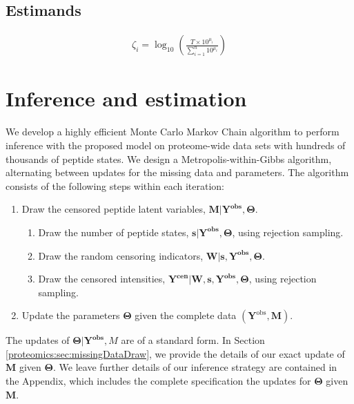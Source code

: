 
\subsection{Estimands}

\begin{eqnarray}
\zeta_i = \log_{10} \left( \frac{T \times 10^{\mu_i}}{ \sum_{i=1}^{n} 10^{\mu_i}} \right) \label{proteomics:eq:abs_abund_estimand} 
\end{eqnarray}




\section{Inference and estimation}
\label{proteomics:sec:estimation}

We develop a highly efficient Monte Carlo Markov Chain algorithm to perform inference with the proposed model on proteome-wide data sets with hundreds of thousands of peptide states.
We design a Metropolis-within-Gibbs algorithm, alternating between updates for the missing data and parameters.
The algorithm consists of the following steps within each iteration:
%
\begin{enumerate}
\item Draw the censored peptide latent variables, $\mathbf{M}\vert\mathbf{Y^{obs}}, \bm \Theta$.

\begin{enumerate}
\item Draw the number of peptide states, $\bm s \vert \mathbf{Y^{obs}}, \bm \Theta$, using rejection sampling.
\item Draw the random censoring indicators, $\bm{W} \vert \bm s,  \mathbf{Y^{obs}}, \bm \Theta$.
\item Draw the censored intensities, $\mathbf{Y^{cen}} \vert \bm{W},\bm{s}, \bm{Y^{obs}}, \bm{\Theta}$, using rejection sampling.
\end{enumerate}
\item Update the parameters $\bm \Theta$ given the complete data $(\bm Y^\mathrm{obs}, \bm M)$.
\end{enumerate}
%
The updates of $\bm{\Theta} | \bm{Y^{obs}}, M$ are of a standard form.
In Section \ref{proteomics:sec:missingDataDraw}, we provide the details of our exact update of $\bm M$ given $\bm \Theta$.
We leave further details of our inference strategy are contained in the Appendix, which includes the complete specification the updates for $\bm \Theta$ given $\bm M$.


